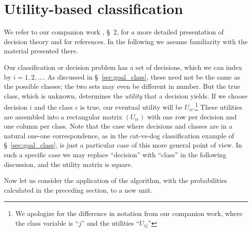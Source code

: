 \documentclass[\ifafour a4paper,12pt,\else a5paper,10pt,\fi%
onecolumn,oneside,article,%
british%
]{memoir}
\theoremstyle{remark}
\theoremstyle{innote}
\renewcommand*{\|}[1][]{\nonscript\:#1\vert\nonscript\:\mathopen{}}
\newcommand*{\sect}{\S}%
\begin{document}
\section{Utility-based classification}
\label{sec:utility_classification}

We refer to our companion work \cite{dyrlandetal2022}, \sect~2, for a more detailed presentation of decision theory and for references. In the following we assume familiarity with the material presented there.

Our classification or decision problem has a set of decisions, which we can index by $i = 1,2,\dotsc$. As discussed in \sect~\ref{sec:goal_class}, these need not be the same as the possible classes; the two sets may even be different in number. But the true class, which is unknown, determines the \emph{utility} that a decision yields. If we choose decision $i$ and the class $c$ is true, our eventual utility will be $U_{ic}$.\footnote{We apologize for the difference in notation from our companion work, where the class variable is \enquote{$j$} and the utilities \enquote{$U_{ij}$}} These utilities are assembled into a rectangular matrix $(U_{ic})$ with one row per decision and one column per class. Note that the case where decisions and classes are in a natural one-one correspondence, as in the cat-vs-dog classification example of \sect~\ref{sec:goal_class}, is just a particular case of this more general point of view. In such a specific case we may replace \enquote{decision} with \enquote{class} in the following discussion, and the utility matrix is square.

\medskip

Now let us consider the application of the algorithm, with the probabilities calculated in the preceding section, to a new unit.
\end{document}
